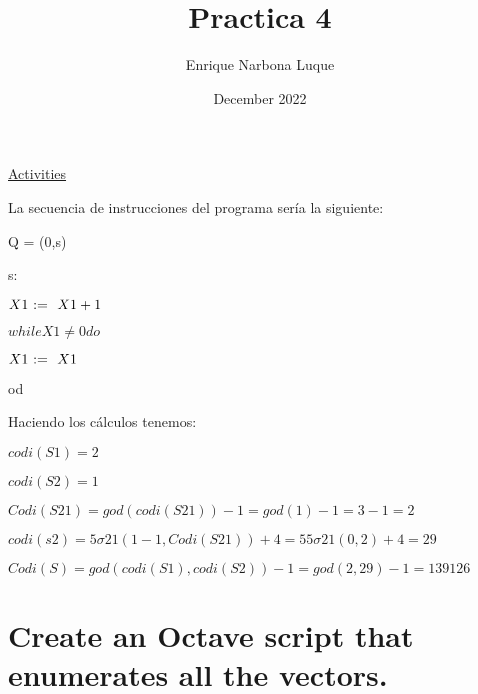 \documentclass{article}
\title{Practica 4}
\author{Enrique Narbona Luque}
\date{December 2022}
\begin{document}
\maketitle\LARGE{\underline{Activities}}

\vspace{4mm}


\vspace{5mm}

\normalsize

La secuencia de instrucciones del programa sería la siguiente:

\vspace{3mm}

Q = (0,s)

s:

$ X1 \Assig X1 + 1 $

$ while X1 \not = 0 do $

$ X1 \Assig X1 $

od

\vspace{5mm}

Haciendo los cálculos tenemos:

\vspace{2mm}

$codi(S1) = 2$

$codi(S2) = 1$

$Codi(S21) = god (codi(S21)) - 1 = god(1) - 1 = 3 - 1 = 2$

$codi(s2) = 5\sigma21(1-1,Codi(S21)) + 4 = 5 5\sigma21(0,2) + 4 = 29$

$Codi(S) = god(codi(S1),codi(S2)) - 1 = god(2,29) - 1 = 139126$

\newpage

\large{\section{Create an Octave script that enumerates all the vectors.}}

 \vspace{5mm}

\end{document}

